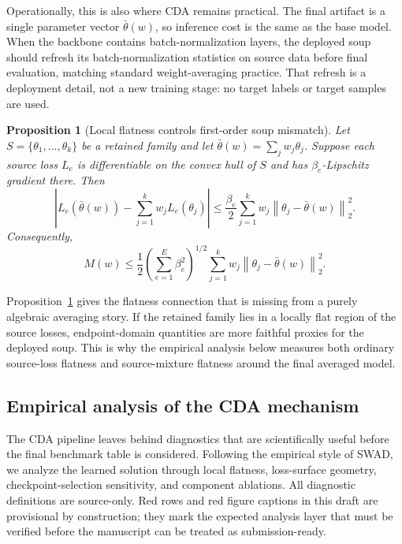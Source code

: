 \documentclass{article}
\newtheorem{proposition}[theorem]{Proposition}
\theoremstyle{definition}
\newcommand{\norm}[1]{\left\lVert #1 \right\rVert}
\newcommand{\thetaw}{\bar{\theta}(w)}
\begin{document}
Operationally, this is also where CDA remains practical. The final artifact is a single parameter vector \(\thetaw\), so inference cost is the same as the base model. When the backbone contains batch-normalization layers, the deployed soup should refresh its batch-normalization statistics on source data before final evaluation, matching standard weight-averaging practice. That refresh is a deployment detail, not a new training stage: no target labels or target samples are used.

\begin{proposition}[Local flatness controls first-order soup mismatch]
\label{prop:flat_merge}
Let \(S=\{\theta_1,\ldots,\theta_k\}\) be a retained family and let \(\thetaw=\sum_j w_j\theta_j\). Suppose each source loss \(L_e\) is differentiable on the convex hull of \(S\) and has \(\beta_e\)-Lipschitz gradient there. Then
\begin{equation}
\left|L_e(\thetaw)-\sum_{j=1}^k w_j L_e(\theta_j)\right|
\le
\frac{\beta_e}{2}\sum_{j=1}^k w_j \norm{\theta_j-\thetaw}_2^2 .
\label{eq:flat_merge}
\end{equation}
Consequently,
\begin{equation}
M(w)
\le
\frac{1}{2}
\left(
\sum_{e=1}^{E}\beta_e^2
\right)^{1/2}
\sum_{j=1}^k w_j\norm{\theta_j-\thetaw}_2^2 .
\label{eq:flat_merge_vector}
\end{equation}
\end{proposition}

Proposition~\ref{prop:flat_merge} gives the flatness connection that is missing from a purely algebraic averaging story. If the retained family lies in a locally flat region of the source losses, endpoint-domain quantities are more faithful proxies for the deployed soup. This is why the empirical analysis below measures both ordinary source-loss flatness and source-mixture flatness around the final averaged model.

\subsection{Empirical analysis of the CDA mechanism}

The CDA pipeline leaves behind diagnostics that are scientifically useful before the final benchmark table is considered. Following the empirical style of SWAD, we analyze the learned solution through local flatness, loss-surface geometry, checkpoint-selection sensitivity, and component ablations. All diagnostic definitions are source-only. Red rows and red figure captions in this draft are provisional by construction; they mark the expected analysis layer that must be verified before the manuscript can be treated as submission-ready.
\end{document}
